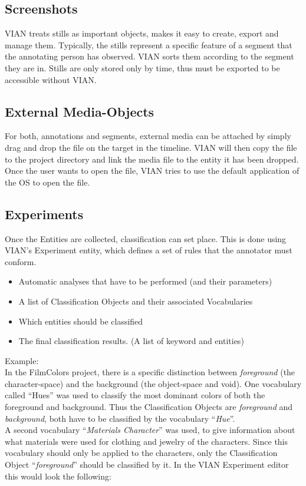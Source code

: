 \documentclass[11pt, a4paper,oneside,chapterprefix=false]{scrbook}
\begin{document}
\subsection{Screenshots}
VIAN treats stills as important objects, makes it easy to create, export and manage them. Typically, the stills represent a specific feature of a segment that the annotating person has observed. VIAN sorts them according to the segment they are in. Stills are only stored only by time, thus must  be exported to be accessible without VIAN. 

\subsection{External Media-Objects}
For both, annotations and segments, external media can be attached by simply drag and drop the file on the target in the timeline. VIAN will then copy the file to the project directory and link the media file to the entity it has been dropped. Once the user wants to open the file, VIAN tries to use the default application of the OS to open the file. 


\subsection{Experiments}

Once the Entities are collected, classification can set place. This is done using VIAN’s Experiment entity, which defines a set of rules that the annotator must conform. 

\begin{itemize}
	\item Automatic analyses that have to be performed (and their parameters)
	\item A list of Classification Objects and their associated Vocabularies
	\item Which entities should be classified
	\item The final classification results. (A list of keyword and entities)
\end{itemize}

Example: \\
In the FilmColors project, there is a specific distinction between \textit{foreground} (the character-space) and the background (the object-space and void). One vocabulary called “Hues” was used to classify the most dominant colors of both the foreground and background. Thus the Classification Objects are \textit{foreground} and \textit{background}, both have to be classified by the vocabulary “\textit{Hue}”.\\
A second vocabulary “\textit{Materials Character}” was used, to give information about what materials were used for clothing and jewelry of the characters. Since this vocabulary should only be applied to the characters, only the Classification Object “\textit{foreground}” should be classified by it.  In the VIAN Experiment editor this would look the following:
\end{document}
